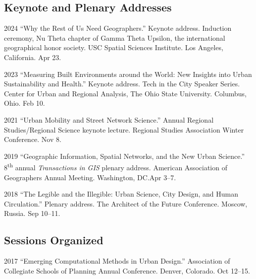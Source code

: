 \documentclass[11pt,letterpaper]{report}
\begin{document}
    \subsection*{Keynote and Plenary Addresses}

    \begin{tablist}

        \item[2024] \tab{}\enquote{Why the Rest of Us Need Geographers.} Keynote address. Induction ceremony, Nu Theta chapter of Gamma Theta Upsilon, the international geographical honor society. USC Spatial Sciences Institute. Los Angeles, California. Apr 23.

        \item[2023] \tab{}\enquote{Measuring Built Environments around the World: New Insights into Urban Sustainability and Health.} Keynote address. Tech in the City Speaker Series. Center for Urban and Regional Analysis, The Ohio State University. Columbus, Ohio. Feb 10.

        \item[2021] \tab{}\enquote{Urban Mobility and Street Network Science.} Annual Regional Studies/Regional Science keynote lecture. Regional Studies Association Winter Conference. Nov 8.

        \item[2019] \tab{}\enquote{Geographic Information, Spatial Networks, and the New Urban Science.} 8\textsuperscript{th} annual \textit{Transactions in GIS} plenary address. American Association of Geographers Annual Meeting. Washington, DC.\@ Apr 3--7.

        \item[2018] \tab{}\enquote{The Legible and the Illegible: Urban Science, City Design, and Human Circulation.} Plenary address. The Architect of the Future Conference. Moscow, Russia. Sep 10--11.

    \end{tablist}

    \subsection*{Sessions Organized}

    \begin{tablist}

        \item[2017] \tab{}\enquote{Emerging Computational Methods in Urban Design.} Association of Collegiate Schools of Planning Annual Conference. Denver, Colorado. Oct 12--15.

    \end{tablist}
\end{document}
